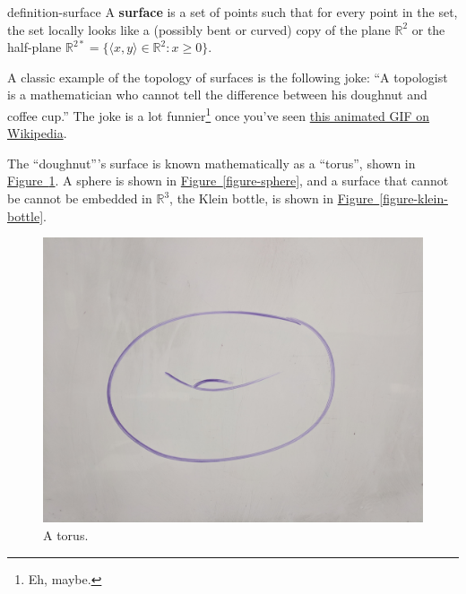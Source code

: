 \documentclass[10pt,]{article}
\newcommand{\terminology}[1]{\textbf{#1}}
\newcommand{\tuple}[1]{\langle #1 \rangle}
\newcommand{\mb}{\mathbb}
\begin{document}
\begin{definition}{}{definition-surface}%
\hypertarget{p-14}{}%
A \terminology{surface} is a set of points such that for every point in the set, the set locally looks like a (possibly bent or curved) copy of the plane \(\mathbb R^2\) or the half-plane \(\mathbb R^{2*}=\{\tuple{x,y}\in\mb R^2:x\geq 0\}\).%
\end{definition}
\hypertarget{p-15}{}%
A classic example of the topology of surfaces is the following joke: ``A topologist is a mathematician who cannot tell the difference between his doughnut and coffee cup.'' The joke is a lot funnier\footnote{Eh, maybe.\label{fn-2}} once you've seen \href{https://en.wikipedia.org/wiki/File:Mug_and_Torus_morph.gif}{this animated GIF on Wikipedia}.%
\par
\hypertarget{p-16}{}%
The ``doughnut'''s surface is known mathematically as a ``torus'', shown in \hyperref[figure-torus]{Figure~\ref{figure-torus}}. A sphere is shown in \hyperref[figure-sphere]{Figure~\ref{figure-sphere}}, and a surface that cannot be cannot be embedded in \(\mathbb R^3\), the Klein bottle, is shown in \hyperref[figure-klein-bottle]{Figure~\ref{figure-klein-bottle}}.%
\begin{figure}
\centering
\includegraphics[width=1\linewidth]{images/torus.jpg}
\caption{A torus.\label{figure-torus}}
\end{figure}
\end{document}
